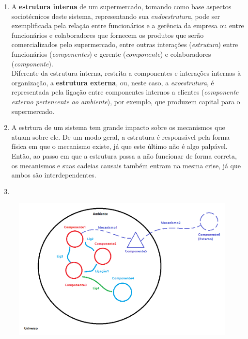 \documentclass{article}
\begin{document}
\begin{enumerate}
    \item A \textbf{estrutura interna} de um supermercado, tomando como base aspectos sociotécnicos deste sistema, representando sua \textit{endoestrutura}, pode ser exemplificada pela relação entre funcionários e a gerência da empresa ou entre funcionários e colaboradores que fornecem os produtos que serão comercializados pelo supermercado, entre outras interações (\textit{estrutura}) entre funcionários (\textit{componentes}) e gerente (\textit{componente}) e colaboradores (\textit{componente}).\\
    Diferente da estrutura interna, restrita a componentes e interações internas à organização, a \textbf{estrutura externa}, ou, neste caso, a \textit{exoestrutura}, é representada pela ligação entre componentes internos a clientes (\textit{componente externo pertencente ao ambiente}), por exemplo, que produzem capital para o supermercado.
    \item A estrtura de um sistema tem grande impacto sobre os mecanismos que atuam sobre ele. De um modo geral, a estrutura é responsável pela forma física em que o mecanismo existe, já que este último não é algo palpável. Então, ao passo em que a estrutura passa a não funcionar de forma correta, os mecanismos e suas cadeias causais também entram na mesma crise, já que ambos são interdependentes.
    \item 
\end{enumerate}
    \begin{figure}[!h]
        \includegraphics[width=16cm]{modeloConceitualCESM.png}
    \end{figure}
\end{document}
